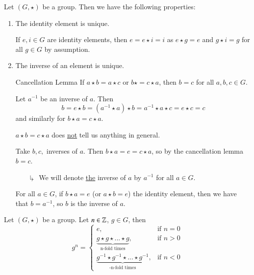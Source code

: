 \documentclass[12pt, a4paper, twoside, openright, titlepage]{book}
\begin{document}
\begin{prop}{}{}
    Let $(G,\star)$ be a group. Then we have the following properties:
    \begin{enumerate}
        \item The identity element is unique.
        \begin{proof*}{}{}
            If $e,i \in G$ are identity elements, then $e = e\star i = i$ as $e \star g = e$ and $g \star i = g$ for all $g \in G$ by assumption.
        \end{proof*}
        \item The inverse of an element is unique.
        \begin{lem}{Cancellation Lemma}{}
            If $a \star b = a \star c$ or $b \star = c \star a$, then $b = c$ for all $a,b,c \in G$. 
        \end{lem}
        \begin{proof*}{}{}
            Let $a^{-1}$ be an inverse of $a$. Then $$b = e\star b = (a^{-1} \star a) \star b = a^{-1} \star a \star c = e \star c = c$$ and similarly for $b \star a = c \star a$.
        \end{proof*}
        \begin{rmk}{}{}
            $a \star b = c \star a$ does \underline{not} tell us anything in general.
        \end{rmk}
        \begin{proof*}{}{}
            Take $b,c,$ inverses of $a$. Then $b \star a = e = c \star a$, so by the cancellation lemma $b = c$.
        \end{proof*}
        \begin{enumerate}
            \item[$\drsh$] We will denote \underline{the} inverse of $a$ by $a^{-1}$ for all $a \in G$. 
        \end{enumerate}
        \begin{cor}{}{}
            For all $a \in G$, if $b \star a = e$ (or $a \star b = e$) the identity element, then we have that $b = a^{-1}$, so $b$ is the inverse of $a$.
        \end{cor}
    \end{enumerate}
\end{prop}


\begin{defn}{}{}
    Let $(G, \star)$ be a group. Let $n \in \mathbb Z$, $g \in G$, then \begin{equation}
        g^n = \left\{\begin{array}{ll} e, & \text{if } n = 0 \\ \underbrace{g\star g \star ... \star g}_{\text{n-fold times}}, & \text{if } n > 0 \\ \underbrace{g^{-1}\star g^{-1} \star ... \star g^{-1}}_{\text{-n-fold times}}, & \text{if } n < 0\end{array}\right.
    \end{equation}
\end{defn}
\end{document}
